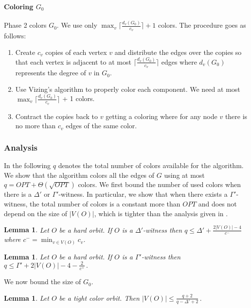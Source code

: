 \documentclass[titlepage, 11pt]{article}
\newtheorem{lemma}[theorem]{Lemma}
\begin{document}
\paragraph{Coloring $G_0$} \label{sec:simple}
Phase 2 colors $G_0$. We use  only $ \max_v \lceil \frac{d_v(G_0)}{c_v}  \rceil + 1 $ colors. The procedure goes as follows: 
\begin{enumerate}
\item Create $c_v$ copies of each vertex $v$ and distribute the edges over the copies so that each vertex is adjacent to at most 
$\lceil \frac{d_v(G_0)}{c_v} \rceil $ edges where $d_v(G_0)$ represents the degree of $v$ in $G_0$.
\item Use Vizing's algorithm to properly color each component. We need at most $\max_v \lceil \frac{d_v(G_0)}{c_v} \rceil $ + 1 colors.
\item Contract the copies back to $v$ getting a coloring where for any node $v$ there is no more than
$c_v$ edges of the same color. 
\end{enumerate}



\subsubsection{Analysis}\label{sec:analysis}
In the following $q$ denotes the total number of colors available for the algorithm. We show that the algorithm colors all the edges of $G$ using at most $q = OPT + \Theta(\sqrt{OPT})$ colors.
We first bound the number of used colors when there is a $\Delta'$ or $\Gamma'$-witness.
In particular, we show that when there exists a $\Gamma'$-witness, 
the total number of colors is a constant more than $OPT$ and does not depend on the size of $|V(O)|$,
which is tighter than the analysis given in \cite{sanders05}.

\begin{lemma}\label{lemma:witness1}
Let $O$ be a hard orbit. If $O$ is a $\Delta'$-witness then
$ q \leq \Delta' + \frac{2|V(O)| -4}{c^-}$
where  $c^- = \min_{v \in V(O)} c_v$. 
\end{lemma}

\begin{lemma}\label{lemma:witness2}
Let $O$ be a hard orbit. If $O$ is a $\Gamma'$-witness then $q \leq \Gamma' + 2|V(O)| - 4 - \frac{2}{c^+}\,.$
\end{lemma}

We now bound the size of $G_0$.

\begin{lemma} \label{lemma:size}
Let $O$ be a tight color orbit. Then $|V(O)| \leq \frac{q + 2}{q  - \Delta' + 2}\,.$ 
\end{lemma} 
\end{document}

